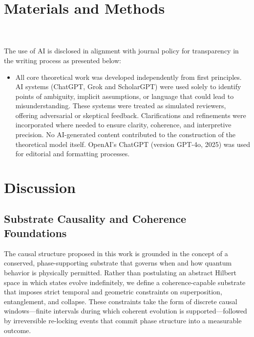 \documentclass[preprints,article,submit,pdftex,moreauthors]{Definitions/mdpi}
\begin{document}
\section{Materials and Methods}
\qsdmethodstatement
\\
\\
The use of AI is disclosed in alignment with journal policy for transparency in the writing process as presented below:\\
\begin{itemize}
    \item All core theoretical work was developed independently from first principles. AI systems (ChatGPT, Grok and ScholarGPT) were used solely to identify points of ambiguity, implicit assumptions, or language that could lead to misunderstanding. These systems were treated as simulated reviewers, offering adversarial or skeptical feedback. Clarifications and refinements were incorporated where needed to ensure clarity, coherence, and interpretive precision. No AI-generated content contributed to the construction of the theoretical model itself. OpenAI’s ChatGPT (version GPT-4o, 2025)  was used for editorial and formatting processes.
\end{itemize}




\section{Discussion}
\subsection{Substrate Causality and Coherence Foundations}
\label{sec:substratefoundation}

The causal structure proposed in this work is grounded in the concept of a conserved, phase-supporting substrate that governs when and how quantum behavior is physically permitted. Rather than postulating an abstract Hilbert space in which states evolve indefinitely, we define a coherence-capable substrate that imposes strict temporal and geometric constraints on superposition, entanglement, and collapse. These constraints take the form of discrete causal windows—finite intervals during which coherent evolution is supported—followed by irreversible re-locking events that commit phase structure into a measurable outcome.
\end{document}
